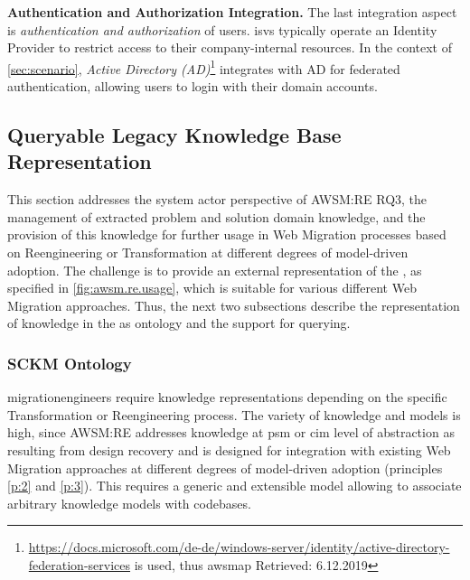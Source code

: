\textbf{Authentication and Authorization Integration.} The last integration aspect is \emph{authentication and authorization} of users.
\glspl{isv} typically operate an Identity Provider to restrict access to their company-internal resources.
In the context of \cref{sec:scenario}, \emph{Active Directory (AD)}\footnote{\url{https://docs.microsoft.com/de-de/windows-server/identity/active-directory-federation-services} is used, thus \gls{awsmap} Retrieved: 6.12.2019} integrates with AD for federated authentication, allowing users to login with their domain accounts.

\vspace{-10pt}
\hypertarget{sec:representation}{%
\subsection[Queryable Legacy Knowledge Base Repres.]{Queryable Legacy Knowledge Base Representation}\label{sec:representation}}
\vspace{10pt}

This section addresses the system actor perspective of AWSM:RE RQ3, the management of extracted problem and solution domain knowledge, and the provision of this knowledge for further usage in \gls{Web Migration} processes based on \gls{Reengineering} or \gls{Transformation} at different degrees of model-driven adoption.
The challenge is to provide an external representation of the \awsmknowledgebase, as specified in \cref{fig:awsm.re.usage}, which is suitable for various different \gls{Web Migration} approaches.
Thus, the next two subsections describe the representation of knowledge in the \awsmknowledgebase as ontology and the support for querying.

\vspace{-10pt}
\subsubsection*{SCKM Ontology}
\glspl{migrationengineer} require knowledge representations depending on the specific \gls{Transformation} or \gls{Reengineering} process.
The variety of knowledge and models is high, since AWSM:RE addresses knowledge at \gls{psm} or \gls{cim} level of abstraction as resulting from design recovery and is designed for integration with existing \gls{Web Migration} approaches at different degrees of model-driven adoption (principles \cref{p:2} and \cref{p:3}).
This requires a generic and extensible model allowing to associate arbitrary knowledge models with  codebases.

